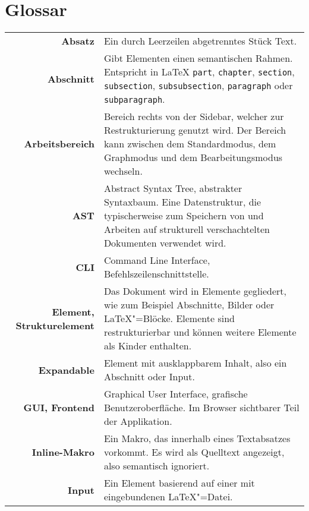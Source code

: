 \section{Glossar}
\label{sec:glossar}

\setlength{\extrarowheight}{2em}

\begin{longtable}{>{\bfseries}rp{9cm}}
  Absatz &
  Ein durch Leerzeilen abgetrenntes Stück Text. \\

  Abschnitt &
  Gibt Elementen einen semantischen Rahmen.
  Entspricht in \LaTeX{} \verb|part|, \verb|chapter|, \verb|section|, \verb|subsection|, \verb|subsubsection|,
  \verb|paragraph| oder \verb|subparagraph|. \\

  Arbeitsbereich &
  Bereich rechts von der Sidebar, welcher zur Restrukturierung genutzt wird.
  Der Bereich kann zwischen dem Standardmodus, dem Graphmodus und dem Bearbeitungsmodus wechseln. \\

  AST &
  Abstract Syntax Tree, abstrakter Syntaxbaum.
  Eine Datenstruktur, die typischerweise zum Speichern von und Arbeiten auf strukturell verschachtelten Dokumenten
  verwendet wird. \\

  CLI &
  Command Line Interface, Befehlszeilenschnittstelle. \\

  Element, Strukturelement &
  Das Dokument wird in Elemente gegliedert, wie zum Beispiel Abschnitte, Bilder oder \LaTeX"=Blöcke.
  Elemente sind restrukturierbar und können weitere Elemente als Kinder enthalten. \\

  Expandable &
  Element mit ausklappbarem Inhalt, also ein Abschnitt oder Input. \\

  GUI, Frontend &
  Graphical User Interface, grafische Benutzeroberfläche.
  Im Browser sichtbarer Teil der Applikation. \\

  Inline-Makro &
  Ein Makro, das innerhalb eines Textabsatzes vorkommt.
  Es wird als Quelltext angezeigt, also semantisch ignoriert. \\

  Input &
  Ein Element basierend auf einer mit \verb|| eingebundenen \LaTeX"=Datei. \\


\end{longtable}
